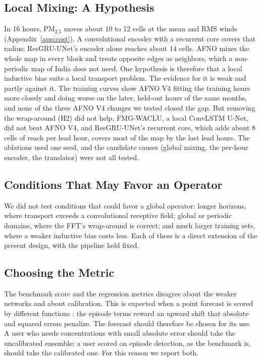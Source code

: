 \documentclass[journal]{IEEEtran}
\newcommand{\PM}{PM$_{2.5}$}
\begin{document}
\subsection{Local Mixing: A Hypothesis}
In 16 hours, \PM{} moves about 10 to 12 cells at the mean and RMS winds (Appendix~\ref{app:cost}). A convolutional encoder with a recurrent core covers that radius; ResGRU-UNet's encoder alone reaches about 14 cells. AFNO mixes the whole map in every block and treats opposite edges as neighbors, which a non-periodic map of India does not need. One hypothesis is therefore that a local inductive bias suits a local transport problem. The evidence for it is weak and partly against it. The training curves show AFNO V4 fitting the training hours more closely and doing worse on the later, held-out hours of the same months, and none of the three AFNO V4 changes we tested closed the gap. But removing the wrap-around (H2) did not help, FMG-WACLU, a local ConvLSTM U-Net, did not beat AFNO V4, and ResGRU-UNet's recurrent core, which adds about 8 cells of reach per lead hour, covers most of the map by the last lead hours. The ablations used one seed, and the candidate causes (global mixing, the per-hour encoder, the translator) were not all tested.

\subsection{Conditions That May Favor an Operator}
We did not test conditions that could favor a global operator: longer horizons, where transport exceeds a convolutional receptive field; global or periodic domains, where the FFT's wrap-around is correct; and much larger training sets, where a weaker inductive bias costs less. Each of these is a direct extension of the present design, with the pipeline held fixed.

\subsection{Choosing the Metric}
The benchmark score and the regression metrics disagree about the weaker networks and about calibration. This is expected when a point forecast is scored by different functions \cite{gneiting2011}: the episode terms reward an upward shift that absolute and squared errors penalize. The forecast should therefore be chosen for its use. A user who needs concentrations with small absolute error should take the uncalibrated ensemble; a user scored on episode detection, as the benchmark is, should take the calibrated one. For this reason we report both.
\end{document}
